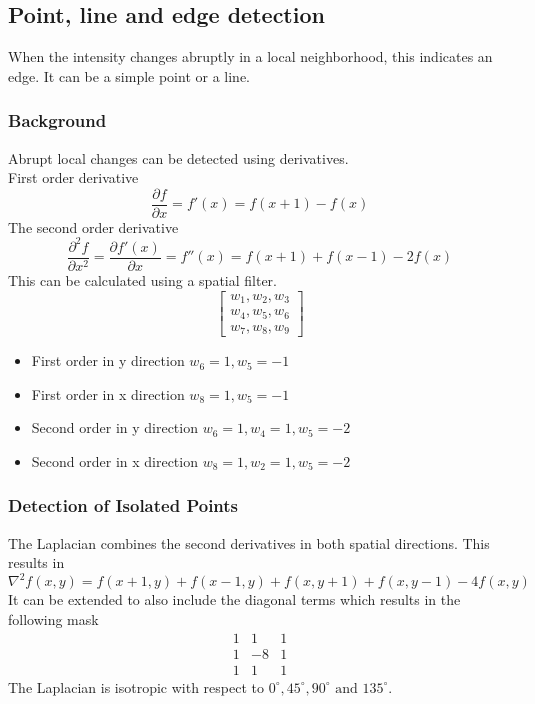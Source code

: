 \subsection{Point, line and edge detection}

When the intensity changes abruptly in a local neighborhood, this indicates an edge. It can be a simple point or a line.

\subsubsection{Background}

Abrupt local changes can be detected using derivatives.\\
First order derivative
\[
	\frac{\partial f}{\partial x} = f'(x)=f(x+1)-f(x)
\]
The second order derivative
\[
	\frac{\partial^2f}{\partial x^2}=\frac{\partial f'(x)}{\partial x}=f''(x)=f(x+1)+f(x-1)-2f(x)
\]
This can be calculated using a spatial filter.
\[
	\begin{bmatrix}
	w_1, w_2, w_3\\
	w_4, w_5, w_6\\
	w_7, w_8, w_9
	\end{bmatrix}
\]
\begin{itemize}
\item First order in y direction $w_6=1, w_5=-1$
\item First order in x direction $w_8=1, w_5=-1$
\item Second order in y direction $w_6=1, w_4=1, w_5=-2$
\item Second order in x direction $w_8=1, w_2=1, w_5=-2$
\end{itemize}
\subsubsection{Detection of Isolated Points}
The Laplacian combines the second derivatives in both spatial directions. This results in
\[
	\nabla^2f(x,y)=f(x+1,y)+f(x-1,y)+f(x,y+1)+f(x,y-1)-4f(x,y)
\]
It can be extended to also include the diagonal terms which results in the following mask
\[
	\begin{matrix}
	 1 & 1 & 1\\
	 1 & -8 & 1\\
	 1 & 1 & 1
	\end{matrix}
\]
The Laplacian is isotropic with respect to $0^\circ, 45^\circ, 90^\circ \text{ and } 135^\circ$. \\

